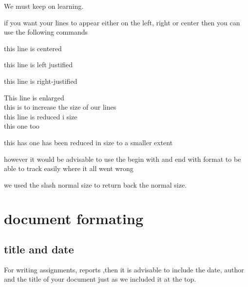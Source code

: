 \documentclass[a4paper,12pt]{article}
\begin{document}
\begin{tiny}We must keep on learning.\end{tiny}

if you want your lines to appear either on the left, right or center then you can use the following commands

\begin{center}
	
this line is centered
\end{center}

\begin{flushleft}this line is left justified\end{flushleft}

\begin{flushright}this line is right-justified\end{flushright}
\vspace{0.5cm}


\vspace{0.3cm}
\large
{This line is enlarged\\
this is to increase the size of our line}s\\
\vspace{0.3cm}
\tiny
this line is reduced i size\\
this one too


\small
this has one has been reduced in size to a smaller extent

however it would be advisable to use the begin with and end with format to be able to track easily where it all went wrong
\vspace{0.1cm}

\normalsize
we used the slash normal size to return back the normal size.

\section{document formating}

\subsection{title and date}
For writing assignments, reports ,then it is advisable to include the date, author and the title of your document just as we included it at the top. \\[5pt]
\end{document}
